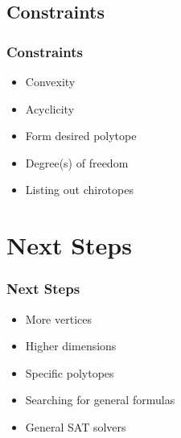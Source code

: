 \documentclass{beamer}
\begin{document}

\subsection{Constraints}
\begin{frame}
    \frametitle{Constraints}
    \begin{itemize}
        \item Convexity
        \item Acyclicity
        \item Form desired polytope
        \item Degree(s) of freedom
        \item Listing out chirotopes
    \end{itemize}
\end{frame}
   

\section{Next Steps}

\begin{frame}
    \frametitle{Next Steps}
    \begin{itemize}
        \item More vertices
        \item Higher dimensions
        \item Specific polytopes
        \item Searching for general formulas
        \item General SAT solvers
    \end{itemize}
\end{frame}
   
    
\end{document}
